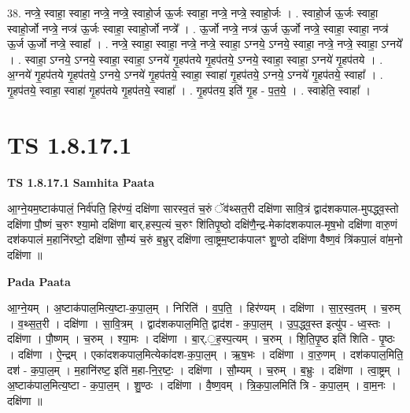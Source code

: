 \documentclass[17pt]{extarticle}
\begin{document}
38. नप्त्रे॒ स्वाहा॒ स्वाहा॒ नप्त्रे॒ नप्त्रे॒ स्वाहो॒र्ज ऊ॒र्जः स्वाहा॒ नप्त्रे॒ नप्त्रे॒ स्वाहो॒र्जः । . स्वाहो॒र्ज ऊ॒र्जः स्वाहा॒ स्वाहो॒र्जो नप्त्रे॒ नप्त्र॑ ऊ॒र्जः स्वाहा॒ स्वाहो॒र्जो नप्त्रे᳚ । . ऊ॒र्जो नप्त्रे॒ नप्त्र॑ ऊ॒र्ज ऊ॒र्जो नप्त्रे॒ स्वाहा॒ स्वाहा॒ नप्त्र॑ ऊ॒र्ज ऊ॒र्जो नप्त्रे॒ स्वाहा᳚ । . नप्त्रे॒ स्वाहा॒ स्वाहा॒ नप्त्रे॒ नप्त्रे॒ स्वाहा॒ ऽग्नये॒ ऽग्नये॒ स्वाहा॒ नप्त्रे॒ नप्त्रे॒ स्वाहा॒ ऽग्नये᳚ । . स्वाहा॒ ऽग्नये॒ ऽग्नये॒ स्वाहा॒ स्वाहा॒ ऽग्नये॑ गृ॒हप॑तये गृ॒हप॑तये॒ ऽग्नये॒ स्वाहा॒ स्वाहा॒ ऽग्नये॑ गृ॒हप॑तये । . अ॒ग्नये॑ गृ॒हप॑तये गृ॒हप॑तये॒ ऽग्नये॒ ऽग्नये॑ गृ॒हप॑तये॒ स्वाहा॒ स्वाहा॑ गृ॒हप॑तये॒ ऽग्नये॒ ऽग्नये॑ गृ॒हप॑तये॒ स्वाहा᳚ । . गृ॒हप॑तये॒ स्वाहा॒ स्वाहा॑ गृ॒हप॑तये गृ॒हप॑तये॒ स्वाहा᳚ । . गृ॒हप॑तय॒ इति॑ गृ॒ह - प॒त॒ये॒ । . स्वाहेति॒ स्वाहा᳚ । \newline
\pagebreak
{}
\section*{ TS 1.8.17.1 }

\textbf{TS 1.8.17.1 } \newline
\textbf{Samhita Paata} \newline

आ॒ग्ने॒यम॒ष्टाक॑पालं॒ निर्व॑पति॒ हिर॑ण्यं॒ दक्षि॑णा सारस्व॒तं च॒रुं ॅव॑थ्सत॒री दक्षि॑णा सावि॒त्रं द्वाद॑शकपाल-मुपद्ध्व॒स्तो दक्षि॑णा पौ॒ष्णं च॒रुꣳ श्या॒मो दक्षि॑णा बार्.हस्प॒त्यं च॒रुꣳ शि॑तिपृ॒ष्ठो दक्षि॑णै॒न्द्र-मेका॑दशकपाल-मृष॒भो दक्षि॑णा वारु॒णं दश॑कपालं म॒हानि॑रष्टो॒ दक्षि॑णा सौ॒म्यं च॒रुं ब॒भ्रुर् दक्षि॑णा त्वा॒ष्ट्रम॒ष्टाक॑पालꣳ शु॒ण्ठो दक्षि॑णा वैष्ण॒वं त्रि॑कपा॒लं वा॑म॒नो दक्षि॑णा ॥ \newline

\textbf{Pada Paata} \newline

आ॒ग्ने॒यम् । अ॒ष्टाक॑पाल॒मित्य॒ष्टा-क॒पा॒ल॒म् । निरिति॑ । व॒प॒ति॒ । हिर॑ण्यम् । दक्षि॑णा । सा॒र॒स्व॒तम् । च॒रुम् । व॒थ्स॒त॒री । दक्षि॑णा । सा॒वि॒त्रम् । द्वाद॑शकपाल॒मिति॒ द्वाद॑श - क॒पा॒ल॒म् । उ॒प॒द्ध्व॒स्त इत्यु॑प - ध्व॒स्तः । दक्षि॑णा । पौ॒ष्णम् । च॒रुम् । श्या॒मः । दक्षि॑णा । बा॒र्.॒ह॒स्प॒त्यम् । च॒रुम् । शि॒ति॒पृ॒ष्ठ इति॑ शिति - पृ॒ष्ठः । दक्षि॑णा । ऐ॒न्द्रम् । एका॑दशकपाल॒मित्येका॑दश-क॒पा॒ल॒म् । ऋ॒ष॒भः । दक्षि॑णा । वा॒रु॒णम् । दश॑कपाल॒मिति॒ दश॑ - क॒पा॒ल॒म् । म॒हानि॑रष्ट॒ इति॑ म॒हा-नि॒र॒ष्टः॒ । दक्षि॑णा । सौ॒म्यम् । च॒रुम् । ब॒भ्रुः । दक्षि॑णा । त्वा॒ष्ट्रम् । अ॒ष्टाक॑पाल॒मित्य॒ष्टा - क॒पा॒ल॒म् । शु॒ण्ठः । दक्षि॑णा । वै॒ष्ण॒वम् । त्रि॒क॒पा॒लमिति॑ त्रि - क॒पा॒ल॒म् । वा॒म॒नः । दक्षि॑णा ॥  \newline
\end{document}
